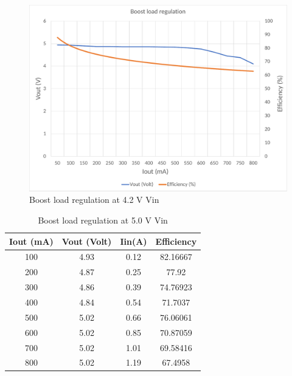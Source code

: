\\ 
\begin{figure}[H]
	\centering
	\includegraphics[width=0.8\columnwidth]{IMGS/Boost load regulation at 4.2V Vin.pdf}
	\caption{Boost load regulation at 4.2 V Vin}
	\label{fig:arch}
\end{figure}
\begin{table}[!ht]
\centering
\begin{tabular}{c c c c}
\toprule
Iout (mA) & Vout (Volt) & Iin(A) & Efficiency \\ \midrule\midrule
100       & 4.93        & 0.12   & 82.16667   \\ 
200       & 4.87        & 0.25   & 77.92      \\ 
300       & 4.86        & 0.39   & 74.76923   \\ 
400       & 4.84        & 0.54   & 71.7037    \\ 
500       & 5.02        & 0.66   & 76.06061   \\ 
600       & 5.02        & 0.85   & 70.87059   \\ 
700       & 5.02        & 1.01   & 69.58416   \\ 
800       & 5.02        & 1.19   & 67.4958    \\ \bottomrule
\end{tabular}
\caption{Boost load regulation at 5.0 V Vin}
\label{table:4}
\end{table}

